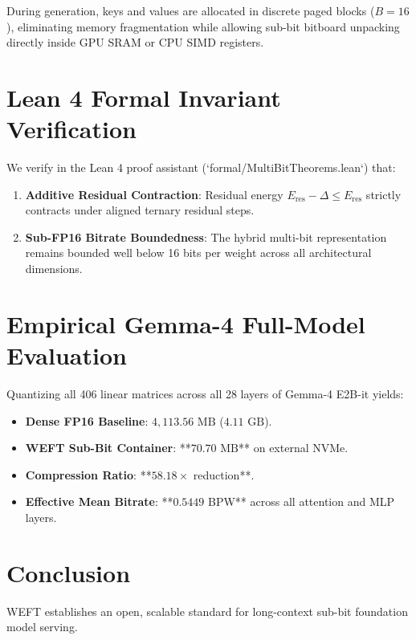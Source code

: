 \documentclass[11pt,a4paper]{article}
\begin{document}
During generation, keys and values are allocated in discrete paged blocks ($B=16$), eliminating memory fragmentation while allowing sub-bit bitboard unpacking directly inside GPU SRAM or CPU SIMD registers.

\section{Lean 4 Formal Invariant Verification}
We verify in the Lean 4 proof assistant (`formal/MultiBitTheorems.lean`) that:
\begin{enumerate}
    \item \textbf{Additive Residual Contraction}: Residual energy $E_{\text{res}} - \Delta \le E_{\text{res}}$ strictly contracts under aligned ternary residual steps.
    \item \textbf{Sub-FP16 Bitrate Boundedness}: The hybrid multi-bit representation remains bounded well below 16 bits per weight across all architectural dimensions.
\end{enumerate}

\section{Empirical Gemma-4 Full-Model Evaluation}
Quantizing all 406 linear matrices across all 28 layers of Gemma-4 E2B-it yields:
\begin{itemize}
    \item \textbf{Dense FP16 Baseline}: $4,113.56\text{ MB}$ ($4.11\text{ GB}$).
    \item \textbf{WEFT Sub-Bit Container}: **$70.70\text{ MB}$** on external NVMe.
    \item \textbf{Compression Ratio}: **$58.18\times$ reduction**.
    \item \textbf{Effective Mean Bitrate}: **$0.5449$ BPW** across all attention and MLP layers.
\end{itemize}

\section{Conclusion}
WEFT establishes an open, scalable standard for long-context sub-bit foundation model serving.
\end{document}
